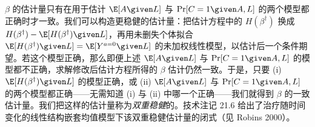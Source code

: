 \begin{techpoint}[结构嵌套均值模型的 g 估计]
$\beta$ 的估计量只有在用于估计 $\E[A\given L]$ 与 $\Pr[C=1\given A,L]$ 的两个模型都正确时才一致。我们可以构造更稳健的估计量：把估计方程中的 $H(\beta^\dagger)$ 换成 $H(\beta^\dagger)-\E[H(\beta^\dagger)\given L]$，再用未删失个体拟合 $\E[H(\beta^\dagger)\given L]=\E[Y^{a=0}\given L]$ 的未加权线性模型，以估计后一个条件期望。若这个模型正确，那么即便上述 $\E[A\given L]$ 与 $\Pr[C=1\given A,L]$ 的模型都不正确，求解修改后估计方程所得的 $\beta$ 估计仍然一致。于是，只要 (i) $\E[H(\beta^\dagger)\given L]$ 的模型正确，或 (ii) $\E[A\given L]$ 与 $\Pr[C=1\given A,L]$ 的两个模型都正确——无需知道 (i) 与 (ii) 中哪一个正确——我们就得到 $\beta$ 的一致估计量。我们把这样的估计量称为\emph{双重稳健}的。技术注记 21.6 给出了治疗随时间变化的线性结构嵌套均值模型下该双重稳健估计量的闭式（见 Robins 2000）。
\end{techpoint}
